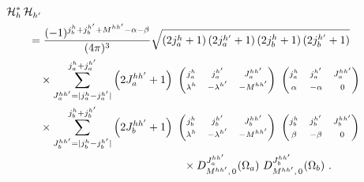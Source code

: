 \begin{align}
  \label{eq:angAmpSqEval}
  &\angAmp[h]^*\,\angAmp[h']^{\phantom{*}} \nonumber\\*
  &\qquad=\frac{(-1)^{j_b^h+j_b^{h'}+M^{hh'}-\alpha-\beta}}{(4\pi)^{3}}
    \sqrt{(2j_a^h+1)\, (2j_a^{h'}+1)\, (2j_b^h+1)\, (2j_b^{h'}+1)} \nonumber\\
    &\qquad\quad \times
    \sum_{J_a^{hh'}=|j_a^h-j_a^{h'}|}^{j_a^h+j_a^{h'}} \left(2J_a^{hh'}+1\right)\
    \begin{pmatrix}
      \mss{j_a^h} & \mss{j_a^{h'}} & \mss{J_a^{hh'}} \\
      \mss{\lambda^h} & \mss{-\lambda^{h'}} & \mss{-M^{hh'}}
    \end{pmatrix}\
    \begin{pmatrix}
      \mss{j_a^h} & \mss{j_a^{h'}} & \mss{J_a^{hh'}} \\
      \mss{\alpha} & \mss{-\alpha} & \mss{0}
    \end{pmatrix} \nonumber\\
    &\qquad\quad \times
    \sum_{J_b^{hh'}=|j_b^h-j_b^{h'}|}^{j_b^h+j_b^{h'}} \left(2J_b^{hh'}+1\right)\
    \begin{pmatrix}
      \mss{j_b^h} & \mss{j_b^{h'}} & \mss{J_b^{hh'}} \\
      \mss{\lambda^h} & \mss{-\lambda^{h'}} & \mss{-M^{hh'}}
    \end{pmatrix}\
    \begin{pmatrix}
      \mss{j_b^h} & \mss{j_b^{h'}} & \mss{J_b^{hh'}} \\
      \mss{\beta} & \mss{-\beta} & \mss{0}
    \end{pmatrix} \nonumber\\*
    &\qquad\qquad\qquad\qquad\qquad\qquad\qquad\qquad\times
      \WD{J_a^{hh'}}{M^{hh'}}{0}{}(\Omega_a)\ \WD{J_b^{hh'}}{M^{hh'}}{0}{}(\Omega_b)\ .
\end{align}

